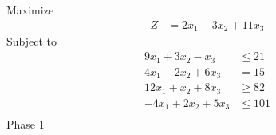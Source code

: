 \documentclass[12pt]{article}
\begin{document}
\subsection{}
Maximize
\begin{align*}
Z                     & = 2x_{1}-3x_{2}+11x_{3}
\end{align*}
Subject to
\begin{align*}
9x_{1}+3x_{2}-x_{3}   & \le 21                                                                                                                                                                                                                 \\
4x_{1}-2x_{2}+6x_{3}  & = 15                                                                                                                                                                                                                   \\
12x_{1}+x_{2}+8x_{3}  & \ge 82                                                                                                                                                                                                                 \\
-4x_{1}+2x_{2}+5x_{3} & \le 101                                                                                                                                                                                                                \\
\end{align*}
Phase 1                                                                                                                                                                                                                                        \\[5pt]
\end{document}
